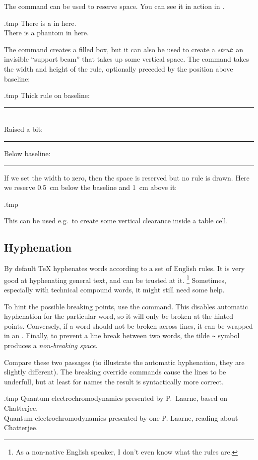 The  command can be used to reserve space.
You can see it in action in .
%
\begin{VerbatimOut}{\jobname.tmp}
There is a \phantom{phantom} in here.\\
There is a phantom in here.
\end{VerbatimOut}
\ShowExampleBelow

The  command creates a filled box,
but it can also be used to create a \emph{strut}:
an invisible ``support beam'' that takes up some vertical space.
The command takes the width and height of the rule,
optionally preceded by the position above baseline:
%
\begin{VerbatimOut}{\jobname.tmp}
Thick rule on baseline: \rule{1cm}{3pt}\\
Raised a bit: \rule[6pt]{1cm}{3pt}
Below baseline: \rule[-3pt]{1cm}{3pt}
\end{VerbatimOut}
\ShowExample
%
If we set the width to zero, then the space is reserved but no rule is drawn.
Here we reserve 0.5~cm below the baseline and 1~cm above it:
%
\begin{VerbatimOut}{\jobname.tmp}
\end{VerbatimOut}
\ShowExample
%
This can be used e.g.\ to create some vertical clearance inside a table cell.



%
%
\subsection{Hyphenation}
By default \TeX{} hyphenates words according to a set of English rules.
It is very good at hyphenating general text, and can be trusted at it.%
\footnote{As a non-native English speaker, I don't even know what the rules are.}
Sometimes, especially with technical compound words, it might still need some help.

To hint the possible breaking points, use the \cmd{-} command.
This disables automatic hyphenation for the particular word,
so it will only be broken at the hinted points.
Conversely, if a word should not be broken across lines, it can be wrapped in an .
Finally, to prevent a line break between two words,
the tilde \verb|~| symbol produces a \emph{non-breaking space}.

Compare these two passages (to illustrate the automatic hyphenation, they are slightly different).
The breaking override commands cause the lines to be underfull,
but at least for names the result is syntactically more correct.
%
\begin{VerbatimOut}{\jobname.tmp}
Quantum electro\-chromo\-dynamics
presented by P.~Laarne,
based on \mbox{Chatterjee}.\\

Quantum electrochromodynamics
presented by one P. Laarne,
reading about Chatterjee.
\end{VerbatimOut}
\ShowExample

